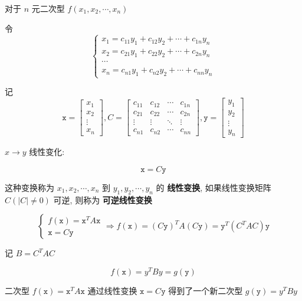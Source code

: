 \begin{definition}[线性变换]
	对于 $n$ 元二次型 $f(x_{1},x_{2},\cdots,x_{n})$ 
	
	令  
	$$\begin{cases}
		x_{1} = c_{11}y_{1} + c_{12}y_{2} + \cdots + c_{1n}y_{n}\\
		x_{2} = c_{21}y_{1} + c_{22}y_{2} + \cdots + c_{2n}y_{n}\\
		\cdots\\
		x_{n} = c_{n1}y_{1} + c_{n2}y_{2} + \cdots + c_{nn}y_{n}
	\end{cases}$$

	记
	$$\mathtt{x} = 
	\begin{bmatrix}
		x_{1} \\ x_{2} \\ \vdots \\x_{n}
	\end{bmatrix}, 
	C = \begin{bmatrix}
	c_{11} & c_{12} & \cdots & c_{1n}\\
	c_{21} & c_{22} & \cdots & c_{2n}\\
	\vdots & \vdots & \ddots & \vdots\\
	c_{n1} & c_{n2} & \cdots & c_{nn}
	\end{bmatrix}, 
	\mathtt{y} = 
	\begin{bmatrix}
		y_{1} \\ y_{2} \\ \vdots \\y_{n}
	\end{bmatrix}$$

	$x\to y$ 线性变化:
	
	$$\mathtt{x}=C\mathtt{y}$$
	
	这种变换称为 $x_{1},x_{2},\cdots,x_{n}$ 到 $y_{1},y_{2},\cdots,y_{n}$ 的 \textbf{线性变换}, 
	如果线性变换矩阵 $C(|C|\neq 0)$ 可逆, 则称为 \textbf{可逆线性变换}
	
	$$\begin{cases}
		f(\mathtt{x}) = \mathtt{x}^{T}A\mathtt{x}\\ 
		\mathtt{x} = C\mathtt{y}
	\end{cases}\Rightarrow 
	f(\mathtt{x}) = (C\mathtt{y})^{T}A(C\mathtt{y}) = \mathtt{y}^{T}(C^{T}AC)\mathtt{y}$$
	
	记 $B = C^{T}AC$ 

	$$f(\mathtt{x}) = y^{T}By = g(\mathtt{y})$$

	二次型 $f(\mathtt{x}) = \mathtt{x}^{T}A\mathtt{x}$ 通过线性变换 $\mathtt{x} = C\mathtt{y}$ 得到了一个新二次型 $g(\mathtt{y}) = y^{T}By$
\end{definition}

